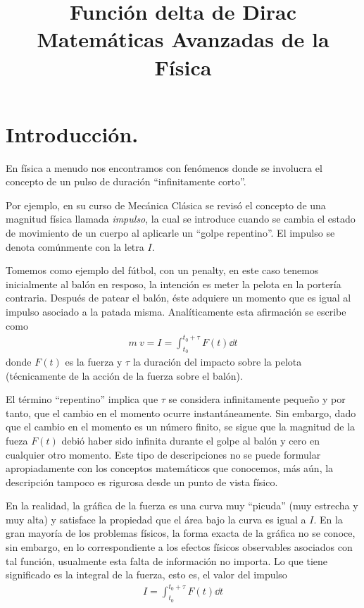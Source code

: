 
\author{}
\title{Función delta de Dirac \\ \large {Matemáticas Avanzadas de la Física}  \vspace{-1.5\baselineskip}}
\date{}

\renewcommand\labelenumii{\theenumi.{\arabic{enumii}}}
\maketitle
\fontsize{14}{14}\selectfont
\section{Introducción.}
En física a menudo nos encontramos con fenómenos donde se involucra el concepto de un pulso de duración \enquote{infinitamente corto}.
\par
Por ejemplo, en su curso de Mecánica Clásica se revisó el concepto de una magnitud física llamada \emph{impulso}, la cual se introduce cuando se cambia el estado de movimiento de un cuerpo al aplicarle un \enquote{golpe repentino}. El impulso se denota comúnmente con la letra $I$.
\par
Tomemos como ejemplo del fútbol, con un penalty, en este caso tenemos inicialmente al balón en resposo, la intención es meter la pelota en la portería contraria. Después de patear el balón, éste adquiere un momento que es igual al impulso asociado a la patada misma. Analíticamente esta afirmación se escribe como
\begin{align*}
m \: v = I = \int_{t_{0}}^{t_{0} + \tau} F(t) \dd{t}
\end{align*}
donde $F(t)$ es la fuerza y $\tau$ la duración del impacto sobre la pelota (técnicamente de la acción de la fuerza sobre el balón).
\par
El término \enquote{repentino} implica que $\tau$ se considera infinitamente pequeño y por tanto, que el cambio en el momento ocurre instantáneamente. Sin embargo, dado que el cambio en el momento es un número finito, se sigue que la magnitud de la fueza $F(t)$ debió haber sido infinita durante el golpe al balón y cero en cualquier otro momento. Este
tipo de descripciones no se puede formular apropiadamente con los conceptos matemáticos que conocemos, más aún, la descripción tampoco es rigurosa desde un punto de vista físico.
\par
En la realidad, la gráfica de la fuerza es una curva muy \enquote{picuda} (muy estrecha y muy alta) y satisface la propiedad que el área bajo la curva es igual a $I$. En la gran mayoría de los problemas físicos, la forma exacta de la gráfica no se conoce, sin embargo, en lo correspondiente a los efectos físicos observables asociados con tal función, usualmente esta falta de información no importa. Lo que tiene significado es la integral de la fuerza, esto es, el valor del impulso
\begin{align*}
I = \int_{t_{0}}^{t_{0} + \tau } F(t) \dd{t}
\end{align*}
